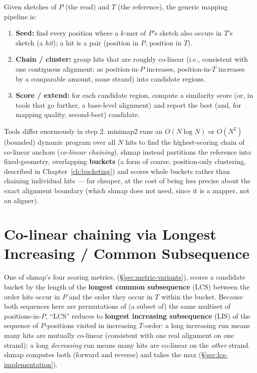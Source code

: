 Given sketches of $P$ (the read) and $T$ (the reference), the generic mapping pipeline is:
\begin{enumerate}
  \item \textbf{Seed:} find every position where a $k$-mer of $P$'s sketch also occurs in $T$'s
    sketch (a \emph{hit}); a hit is a pair (position in $P$, position in $T$).
  \item \textbf{Chain / cluster:} group hits that are roughly co-linear (i.e., consistent with one
    contiguous alignment: as position-in-$P$ increases, position-in-$T$ increases by a
    comparable amount, same strand) into candidate regions.
  \item \textbf{Score / extend:} for each candidate region, compute a similarity score (or, in
    tools that go further, a base-level alignment) and report the best (and, for mapping quality,
    second-best) candidate.
\end{enumerate}
Tools differ enormously in step 2. minimap2 runs an $O(N \log N)$ or $O(N^2)$ (bounded) dynamic
program over all $N$ hits to find the highest-scoring chain of co-linear anchors (\emph{co-linear
chaining}). shmap instead partitions the reference into fixed-geometry, overlapping
\textbf{buckets} (a form of coarse, position-only clustering, described in
Chapter~\ref{ch:bucketing}) and scores whole buckets rather than chaining individual hits --- far
cheaper, at the cost of being less precise about the exact alignment boundary (which shmap does
not need, since it is a mapper, not an aligner).

\section{Co-linear chaining via Longest Increasing / Common Subsequence}
\label{sec:lis-theory}

One of shmap's four scoring metrics,  (\S\ref{sec:metric-variants}), scores a
candidate bucket by the length of the \textbf{longest common subsequence} (LCS) between the order
hits occur in $P$ and the order they occur in $T$ within the bucket. Because both sequences here
are permutations of (a subset of) the same multiset of positions-in-$P$, ``LCS'' reduces to
\textbf{longest increasing subsequence} (LIS) of the sequence of $P$-positions visited in
increasing $T$-order: a long increasing run means many hits are mutually co-linear (consistent
with one real alignment on one strand); a long \emph{decreasing} run means many hits are
co-linear on the \emph{other} strand. shmap computes both (forward and reverse) and takes the max
(\S\ref{sec:lcs-implementation}).

